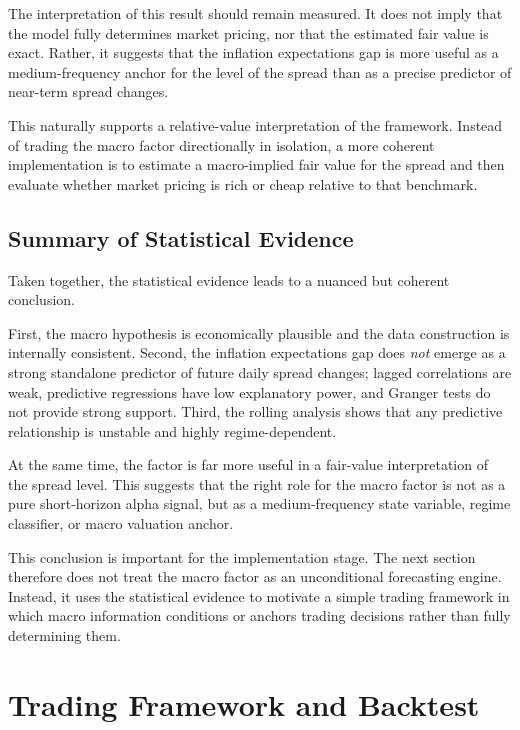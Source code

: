 \documentclass[11pt]{article}
\begin{document}
	The interpretation of this result should remain measured. It does not imply that the model fully determines market pricing, nor that the estimated fair value is exact. Rather, it suggests that the inflation expectations gap is more useful as a medium-frequency anchor for the level of the spread than as a precise predictor of near-term spread changes.
	
	This naturally supports a relative-value interpretation of the framework. Instead of trading the macro factor directionally in isolation, a more coherent implementation is to estimate a macro-implied fair value for the spread and then evaluate whether market pricing is rich or cheap relative to that benchmark.
	
	\subsection{Summary of Statistical Evidence}
	\label{subsec:summary_statistical_evidence}
	
	Taken together, the statistical evidence leads to a nuanced but coherent conclusion.
	
	First, the macro hypothesis is economically plausible and the data construction is internally consistent. Second, the inflation expectations gap does \emph{not} emerge as a strong standalone predictor of future daily spread changes; lagged correlations are weak, predictive regressions have low explanatory power, and Granger tests do not provide strong support. Third, the rolling analysis shows that any predictive relationship is unstable and highly regime-dependent.
	
	At the same time, the factor is far more useful in a fair-value interpretation of the spread level. This suggests that the right role for the macro factor is not as a pure short-horizon alpha signal, but as a medium-frequency state variable, regime classifier, or macro valuation anchor.
	
	This conclusion is important for the implementation stage. The next section therefore does not treat the macro factor as an unconditional forecasting engine. Instead, it uses the statistical evidence to motivate a simple trading framework in which macro information conditions or anchors trading decisions rather than fully determining them.
	
	\section{Trading Framework and Backtest}
	\label{sec:trading_backtest}
	
\end{document}
